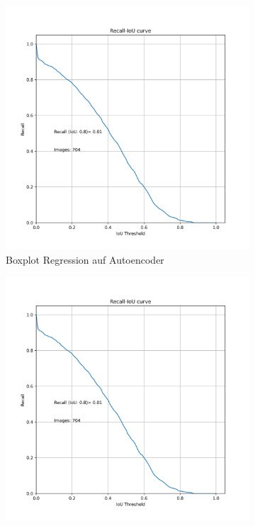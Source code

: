     \begin{figure}[h]
    	\centering
    	\begin{subfigure}[c]{0.49\textwidth}			
    		\includegraphics[width=1\textwidth,center]{bilder/Hauptteil/Autoencoder_Grappel_Detection/IoU.png}
    		\caption[Boxplot]{Boxplot Regression auf Autoencoder}
    		\label{img:BoxPlot_RegressionAufAutoencoder}	
    	\end{subfigure}
    	\begin{subfigure}[c]{0.49\textwidth}			
    		\includegraphics[width=1\textwidth, center]{bilder/Hauptteil/Autoencoder_Grappel_Detection/IoU.png}

\end{subfigure}
\end{figure}
